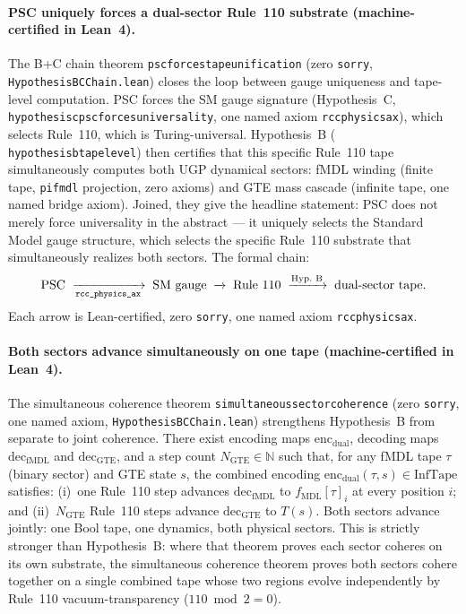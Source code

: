 \documentclass[11pt]{article}
\theoremstyle{remark}
\newcommand{\lean}[1]{%
  \penalty-100
  \begingroup\def\_{\textunderscore\allowbreak}\texttt{#1}\endgroup}
\begin{document}
\paragraph{PSC uniquely forces a dual-sector Rule~110 substrate (machine-certified in Lean~4).}
The B+C chain theorem \lean{psc\_forces\_tape\_unification}
(zero \texttt{sorry}, \lean{HypothesisBCChain.lean})
closes the loop between gauge uniqueness and tape-level computation.
PSC forces the SM gauge signature (Hypothesis~C, \lean{hypothesis\_c\_psc\_forces\_universality},
one named axiom \lean{rcc\_physics\_ax}), which selects Rule~110, which is Turing-universal.
Hypothesis~B (\lean{hypothesis\_b\_tape\_level}) then certifies that this specific Rule~110
tape simultaneously computes both UGP dynamical sectors: fMDL winding (finite tape,
\lean{pi\_fmdl} projection, zero axioms) and GTE mass cascade (infinite tape, one named bridge
axiom). Joined, they give the headline statement: PSC does not merely force universality in
the abstract --- it uniquely selects the Standard Model gauge structure, which selects the
specific Rule~110 substrate that simultaneously realizes both sectors.
The formal chain:
\[
\text{PSC} \;\xrightarrow[\text{\lean{rcc\_physics\_ax}}]{}\;
\text{SM gauge} \;\xrightarrow{}\;
\text{Rule~110} \;\xrightarrow{\text{Hyp.\ B}}\;
\text{dual-sector tape.}
\]
Each arrow is Lean-certified, zero \texttt{sorry}, one named axiom \lean{rcc\_physics\_ax}.

\paragraph{Both sectors advance simultaneously on one tape (machine-certified in Lean~4).}
The simultaneous coherence theorem \lean{simultaneous\_sector\_coherence}
(zero \texttt{sorry}, one named axiom, \lean{HypothesisBCChain.lean})
strengthens Hypothesis~B from separate to joint coherence.
There exist encoding maps $\mathrm{enc}_{\mathrm{dual}}$, decoding maps
$\mathrm{dec}_{\mathrm{fMDL}}$ and $\mathrm{dec}_{\mathrm{GTE}}$, and a step count
$N_{\mathrm{GTE}} \in \mathbb{N}$ such that, for any fMDL tape $\tau$ (binary sector)
and GTE state $s$, the combined encoding $\mathrm{enc}_{\mathrm{dual}}(\tau, s) \in \mathrm{InfTape}$
satisfies:
(i)~one Rule~110 step advances $\mathrm{dec}_{\mathrm{fMDL}}$ to $f_{\mathrm{MDL}}[\tau]_i$
at every position $i$; and
(ii)~$N_{\mathrm{GTE}}$ Rule~110 steps advance $\mathrm{dec}_{\mathrm{GTE}}$ to $T(s)$.
Both sectors advance jointly: one Bool tape, one dynamics, both physical sectors.
This is strictly stronger than Hypothesis~B: where that theorem proves each sector
coheres on its own substrate, the simultaneous coherence theorem proves both sectors
cohere together on a single combined tape whose two regions evolve independently
by Rule~110 vacuum-transparency ($110 \bmod 2 = 0$).
\end{document}
